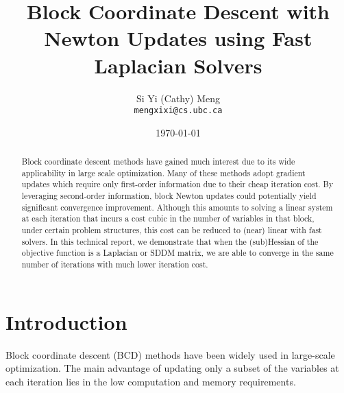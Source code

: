 \documentclass[11pt]{article}
\title{Block Coordinate Descent with Newton Updates using Fast Laplacian Solvers}
\author{
  Si Yi (Cathy) Meng \\
  \texttt{mengxixi@cs.ubc.ca} 
}
\date{\today}
\theoremstyle{definition}
\theoremstyle{definition}
\begin{document}
\maketitle

\begin{abstract}
Block coordinate descent methods have gained much interest due to its wide applicability in large scale optimization. Many of these methods adopt gradient updates which require only first-order information due to their cheap iteration cost. By leveraging second-order information, block Newton updates could potentially yield significant convergence improvement. Although this amounts to solving a linear system at each iteration that incurs a cost cubic in the number of variables in that block, under certain problem structures, this cost can be reduced to (near) linear with fast solvers. In this technical report, we demonstrate that when the (sub)Hessian of the objective function is a Laplacian or SDDM matrix, we are able to converge in the same number of iterations with much lower iteration cost. 




\end{abstract}

\section{Introduction}
Block coordinate descent (BCD) methods have been widely used in large-scale optimization.  The main advantage of updating only a subset of the variables at each iteration lies in the low computation and memory requirements. 
\end{document}
